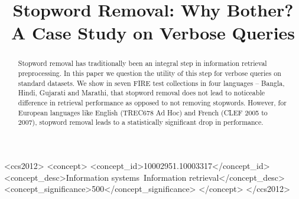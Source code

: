 \documentclass[sigconf]{acmart}
\begin{document}
\title{Stopword Removal: Why Bother? A Case Study on Verbose Queries}





\begin{abstract}
Stopword removal has traditionally been an integral step in information retrieval preprocessing. In this paper we question the utility of this step for verbose queries on standard datasets. We show in seven FIRE test collections in four languages -- Bangla, Hindi, Gujarati and Marathi, that stopword removal does not lead to noticeable difference in retrieval performance as opposed to not removing stopwords. However, for European languages like English (TREC678 Ad Hoc) and French (CLEF 2005 to 2007), stopword removal leads to a statistically significant drop in performance.
\end{abstract}

%
%
\begin{CCSXML}
<ccs2012>
<concept>
<concept_id>10002951.10003317</concept_id>
<concept_desc>Information systems~Information retrieval</concept_desc>
<concept_significance>500</concept_significance>
</concept>
</ccs2012>
\end{CCSXML}





\maketitle
%
%
%
%
%
\end{document}
